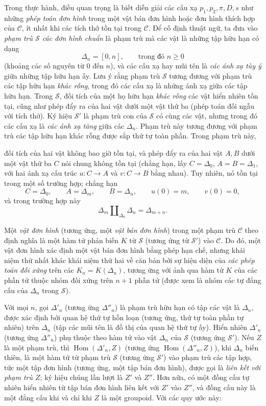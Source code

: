 \documentclass[11pt,twoside,openany]{book}
\numberwithin{equation}{section}
\newcommand{\src}[1]{%
  \phantomsection\hypertarget{src:\fgasourceid:#1}{}%
  \marginpar{\raggedleft\footnotesize\sffamily #1}%
}
\newcommand{\fgasourceid}{unset}
\begin{document}
Trong thực hành, điều quan trọng là biết diễn giải các cấu xạ
$p_1,p_2,\pi,D,s$ như những \emph{phép toán đơn hình} trong một vật bán đơn
hình hoặc đơn hình thích hợp của $\mathcal C$, ít nhất khi các tích thớ tồn
tại trong $\mathcal C$. Để cố định thuật ngữ, ta đưa vào \emph{phạm trù
$\mathcal S$ các đơn hình chuẩn} là phạm trù mà các vật là những tập hữu hạn
có dạng
\[
  \Delta_n=[0,n],\qquad\text{trong đó }n\geq 0
\]
(khoảng các số nguyên từ $0$ đến $n$), và các cấu xạ hay mũi tên là
\emph{các ánh xạ tùy ý} giữa những tập hữu hạn ấy. Lưu ý rằng phạm trù
$\mathcal S$ tương đương với phạm trù các tập hữu hạn \emph{khác rỗng}, trong
đó các cấu xạ là những ánh xạ giữa các tập hữu hạn. Trong $\mathcal S$, đối
tích của một họ hữu hạn \emph{khác rỗng} các vật hiển nhiên tồn tại, cũng như
phép đẩy ra của hai vật dưới một vật thứ ba (phép toán đối ngẫu với tích thớ).
Ký hiệu $\mathcal S'$ là phạm trù con của $\mathcal S$ có cùng các vật, nhưng
trong đó các cấu xạ là \emph{các ánh xạ tăng} giữa các $\Delta_n$. Phạm trù
này tương đương với phạm trù các tập hữu hạn khác rỗng được sắp thứ tự toàn
phần. Trong phạm trù này,
\src{108}
đối tích của hai vật không bao giờ tồn tại, và phép đẩy ra của hai vật $A,B$
dưới một vật thứ ba $C$ nói chung không tồn tại (chẳng hạn, lấy
$C=\Delta_0$, $A=B=\Delta_1$, với hai ánh xạ cấu trúc $u:C\to A$ và
$v:C\to B$ bằng nhau). Tuy nhiên, nó tồn tại trong một số trường hợp; chẳng
hạn
\[
  C=\Delta_0,\qquad A=\Delta_m,\qquad B=\Delta_n,\qquad
  u(0)=m,\qquad v(0)=0,
\]
và trong trường hợp này
\[
  \Delta_m\amalg_{\Delta_0}\Delta_n=\Delta_{m+n}.
\]

Một \emph{vật đơn hình} (tương ứng, một \emph{vật bán đơn hình}) trong một
phạm trù $\mathcal C$ theo định nghĩa là một hàm tử phản biến $K$ từ
$\mathcal S$ (tương ứng từ $\mathcal S'$) vào $\mathcal C$. Do đó, một vật
đơn hình xác định một vật bán đơn hình bằng phép hạn chế, nhưng khái niệm thứ
nhất khác khái niệm thứ hai về căn bản bởi sự hiện diện của \emph{các phép
toán đối xứng} trên các $K_n=K(\Delta_n)$, tương ứng với ảnh qua hàm tử $K$
của các phần tử thuộc nhóm đối xứng trên $n+1$ phần tử (được xem là nhóm các
tự đẳng cấu của $\Delta_n$ trong $\mathcal S$).

Với mọi $n$, gọi $\Delta'_n$ (tương ứng $\Delta''_n$) là phạm trù hữu hạn có
tập các vật là $\Delta_n$, được xác định bởi quan hệ thứ tự hỗn loạn (tương
ứng, thứ tự toàn phần tự nhiên) trên $\Delta_n$ (tập các mũi tên là đồ thị của
quan hệ thứ tự ấy). Hiển nhiên $\Delta'_n$ (tương ứng $\Delta''_n$) phụ thuộc
theo hàm tử vào vật $\Delta_n$ của $\mathcal S$ (tương ứng $\mathcal S'$).
Nếu $Z$ là một phạm trù, thì $\operatorname{Hom}(\Delta'_n,Z)$ (tương ứng
$\operatorname{Hom}(\Delta''_n,Z)$), khi $\Delta_n$ biến thiên, là một hàm tử
từ phạm trù $\mathcal S$ (tương ứng $\mathcal S'$) vào phạm trù các tập hợp,
tức một tập đơn hình (tương ứng, một tập bán đơn hình), được gọi là
\emph{liên kết với phạm trù $Z$}; ký hiệu chúng lần lượt là $Z'$ và $Z''$.
Hơn nữa, có một đồng cấu tự nhiên hiển nhiên từ tập bán đơn hình liên kết
với $Z'$ vào
$Z''$, và đồng cấu này là một đẳng cấu khi và chỉ khi $Z$ là một groupoid. Với
các quy ước này:
\end{document}
